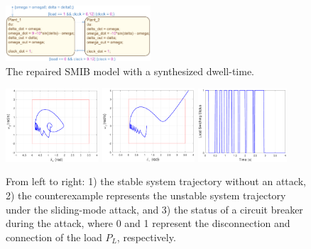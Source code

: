 \begin{figure}[tbp]%
	\centering%
    \includegraphics[width=0.48\textwidth]{image/smib_plant_model_res}%
			\vspace{-0.5em}
	\caption{The repaired SMIB model with a synthesized dwell-time.}%
\vspace{-1em}
\end{figure}%



\begin{figure}[t!]%
	\centering%
    \includegraphics[width=0.31\textwidth]{image/normal}%
		\includegraphics[width=0.307\textwidth]{image/counter}%
		\includegraphics[width=0.294\textwidth]{image/load_v2}%
	\caption{From left to right: 1) the stable system trajectory without an attack, 2) the counterexample represents the unstable system trajectory under the sliding-mode attack, and 3) the status of a circuit breaker during the attack, where 0 and 1 represent the disconnection and connection of the load $P_L$, respectively.}%
\end{figure}%




